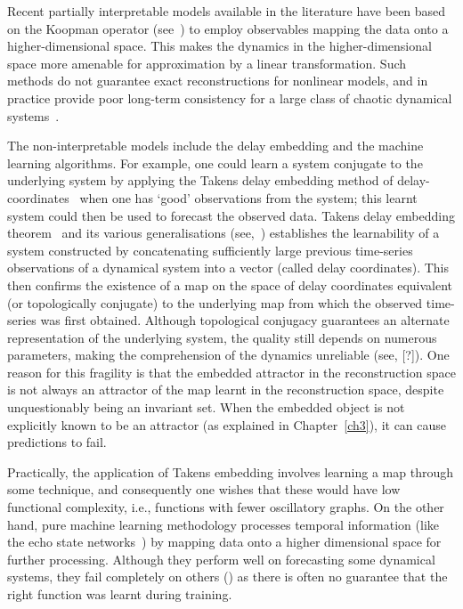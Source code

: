 Recent partially interpretable models available in the literature have been based on the Koopman operator (see~\cite{koopman1932dynamical,budivsic2012applied}) to employ observables mapping the data onto a higher-dimensional space. This makes the dynamics in the higher-dimensional space more amenable for approximation by a linear transformation. Such methods do not guarantee exact reconstructions for nonlinear models, and in practice provide poor long-term consistency for a large class of chaotic dynamical systems~\cite{Supp}.

The non-interpretable models include the delay embedding and the machine learning algorithms. For example, one could learn a system conjugate to the underlying system by applying the Takens delay embedding method of delay-coordinates~\cite{takens1981detecting} when one has `good' observations from the system; this learnt system could then be used to forecast the observed data. 
Takens delay embedding theorem~\cite{takens1981detecting} and its various generalisations (see,~\cite{sauer1991embedology, stark1999delay, gutman2018embedding}) establishes the learnability of a system constructed by concatenating sufficiently large previous time-series observations of a dynamical system into a vector (called delay coordinates). This then confirms the existence of a map on the space of delay coordinates equivalent (or topologically conjugate) to the underlying map from which the observed time-series was first obtained. Although topological conjugacy guarantees an alternate representation of the underlying system, the quality still depends on numerous parameters, making the comprehension of the dynamics unreliable (see, [?]). One reason for this fragility is that the embedded attractor in the reconstruction space is not always an attractor of the map learnt in the reconstruction space, despite unquestionably being an invariant set. When the embedded object is not explicitly known to be an attractor (as explained in Chapter~\ref{ch3}), it can cause predictions to fail.

Practically, the application of Takens embedding involves learning a map through some technique, and consequently one wishes that these would have low functional complexity\cite{manjunath2021universal}, i.e., functions with fewer oscillatory graphs. On the other hand, pure machine learning methodology processes temporal information (like the echo state networks~\cite{Manju_ESP, Manju_IEEE, grigoryeva2018echo}) by mapping data onto a higher dimensional space for further processing. Although they perform  well on forecasting some dynamical systems, they fail completely on others () as there is often no guarantee that the right function was learnt during training.


